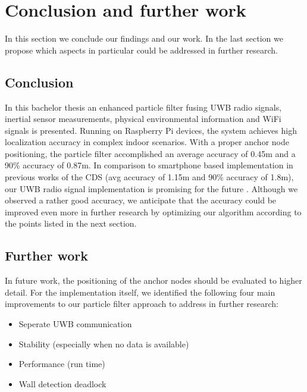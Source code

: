 
\chapter{Conclusion and further work} %

\label{Chapter7} %
In this section we conclude our findings and our work. In the last section we propose which aspects in particular could be addressed in further research. 


\section{Conclusion}
In this bachelor thesis an enhanced particle filter fusing UWB radio signals, inertial sensor measurements, physical environmental information and WiFi signals is presented. Running on Raspberry Pi devices, the system achieves high localization accuracy in complex indoor scenarios. With a proper anchor node positioning, the particle filter accomplished an average accuracy of 0.45m and a 90\% accuracy of 0.87m. In comparison to smartphone based implementation in previous works of the CDS (avg accuracy of 1.15m and 90\% accuracy of 1.8m), our UWB radio signal implementation is promising for the future \cite{Carrera}. Although we observed a rather good accuracy, we anticipate that the accuracy could be improved even more in further research by optimizing our algorithm according to the points listed in the next section.



\section{Further work}
In future work, the positioning of the anchor nodes should be evaluated to higher detail. For the implementation itself, we identified the following four main improvements to our particle filter approach to address in further research:
\begin{itemize}
\item Seperate UWB communication
\item Stability (especially when no data is available)
\item Performance (run time)
\item Wall detection deadlock
\end{itemize}

